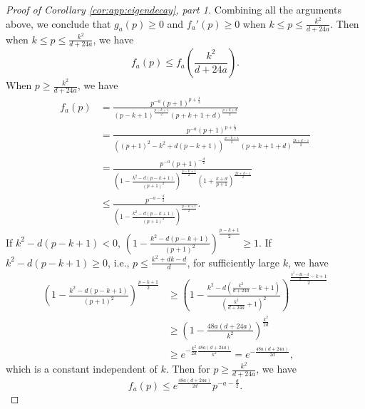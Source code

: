 \begin{proof}[Proof of Corollary \ref{cor:app:eigendecay}, part 1]
Combining all the arguments above, we conclude that $g_a(p)\geq 0$ and $f_a'(p)\geq 0$ when $k\leq p \leq \frac{k^2}{d+24a}$. 
Then when $k\leq p \leq \frac{k^2}{d+24a}$, we have 
\begin{equation}
    f_a(p)\leq f_a\left(\frac{k^2}{d+24a}\right).
    \label{eq:fa_small_p}
\end{equation} 
When $p \geq \frac{k^2}{d+24a}$, we have 
\begin{align*}
    f_a(p)&=\frac{ p^{-a}\left({p+1}\right)^{p+\frac{1}{2}}}{\left({p-k+1}\right)^{\frac{p-k+1}{2}}\left({p+k+1+d}\right)^{\frac{p+k+d}{2}}}\\
    &=\frac{ p^{-a}\left({p+1}\right)^{p+\frac{1}{2}}}{\left((p+1)^2-k^2+d(p-k+1)\right)^{\frac{p-k+1}{2}}\left({p+k+1+d}\right)^{\frac{2k+d-1}{2}}}\\
    &=\frac{ p^{-a}\left({p+1}\right)^{-\frac{d}{2}}}{\left(1-\frac{k^2-d(p-k+1)}{(p+1)^2}\right)^{\frac{p-k+1}{2}}\left({1+\frac{k+d}{p+1}}\right)^{\frac{2k+d-1}{2}}}\\
    &\leq\frac{ p^{-a-\frac{d}{2}}}{\left(1-\frac{k^2-d(p-k+1)}{(p+1)^2}\right)^{\frac{p-k+1}{2}}}.
\end{align*} 
If $k^2-d(p-k+1)<0$, $\left(1-\frac{k^2-d(p-k+1)}{(p+1)^2}\right)^{\frac{p-k+1}{2}}\geq 1$. If $k^2-d(p-k+1)\geq 0$, i.e., $p\leq \frac{k^2+dk-d}{d}$, for sufficiently large $k$, we have
\begin{align*}
    \left(1-\frac{k^2-d(p-k+1)}{(p+1)^2}\right)^{\frac{p-k+1}{2}}&\geq\left(1-\frac{k^2-d(\frac{k^2}{d+24a}-k+1)}{(\frac{k^2}{d+24a}+1)^2}\right)^{\frac{\frac{k^2+dk-d}{d}-k+1}{2}}\\
    &\geq \left(1-\frac{48a(d+24a)}{k^2}\right)^{\frac{k^2}{2d}}\\
    &\geq e^{-\frac{k^2}{2d}\frac{48a(d+24a)}{k^2}}= e^{-\frac{48a(d+24a)}{2d}},
\end{align*}
which is a constant independent of $k$. 
Then for $p \geq \frac{k^2}{d+24a}$, we have
\begin{equation}
f_a(p)\leq e^{\frac{48a(d+24a)}{2d}}p^{-a-\frac{d}{2}}.
\label{eq:fa_large_p}
\end{equation}


\end{proof}
